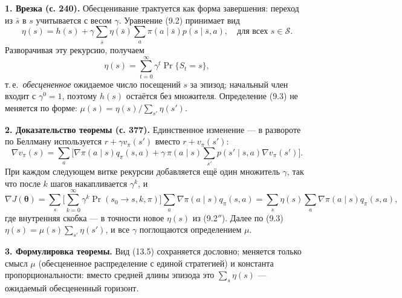 \begin{solution}
    \textbf{1. Врезка (с. 240).} Обесценивание трактуется как форма завершения:
    переход из $\bar s$ в $s$ учитывается с весом $\gamma$. Уравнение (9.2)
    принимает вид
    \begin{equation}
        \eta(s) = h(s) + \gamma\sum_{\bar s}\eta(\bar s)\sum_a \pi(a\mid\bar s)p(s\mid\bar s,a),
        \quad\text{для всех } s\in\mathcal S.
        \tag{9.2$'$}
    \end{equation}
    Разворачивая эту рекурсию, получаем
    \begin{equation}
        \eta(s) = \sum_{t=0}^{\infty}\gamma^t\Pr\{S_t = s\},
        \tag{9.2$''$}
    \end{equation}
    т.\,е.\ \emph{обесцененное} ожидаемое число посещений $s$ за эпизод;
    начальный член входит с $\gamma^0=1$, поэтому $h(s)$ остаётся без множителя.
    Определение (9.3) не меняется по форме: $\mu(s)=\eta(s)/\sum_{s'}\eta(s')$.

    \textbf{2. Доказательство теоремы (с. 377).} Единственное изменение --- в
    развороте по Беллману используется $r+\gamma v_\pi(s')$ вместо $r+v_\pi(s')$:
    \[
        \nabla v_\pi(s) = \sum_a\Big[\nabla\pi(a\mid s)q_\pi(s,a)
        + \gamma\,\pi(a\mid s)\sum_{s'}p(s'\mid s,a)\nabla v_\pi(s')\Big].
    \]
    При каждом следующем витке рекурсии добавляется ещё один множитель $\gamma$,
    так что после $k$ шагов накапливается $\gamma^k$, и
    \[
        \nabla J(\boldsymbol\theta)
        = \sum_s\Big[\sum_{k=0}^{\infty}\gamma^k\Pr(s_0\!\to\! s,k,\pi)\Big]
          \sum_a\nabla\pi(a\mid s)q_\pi(s,a)
        = \sum_s \eta(s)\sum_a\nabla\pi(a\mid s)q_\pi(s,a),
    \]
    где внутренняя скобка --- в точности новое $\eta(s)$ из (9.2$''$). Далее по
    (9.3) $\eta(s)=\mu(s)\sum_{s'}\eta(s')$, и все $\gamma$ поглощаются
    определением $\mu$.

    \textbf{3. Формулировка теоремы.} Вид (13.5) сохраняется дословно; меняется
    только смысл $\mu$ (обесцененное распределение с единой стратегией) и
    константа пропорциональности: вместо средней длины эпизода это
    $\sum_{s}\eta(s)$ --- ожидаемый обесцененный горизонт.


\end{solution}
